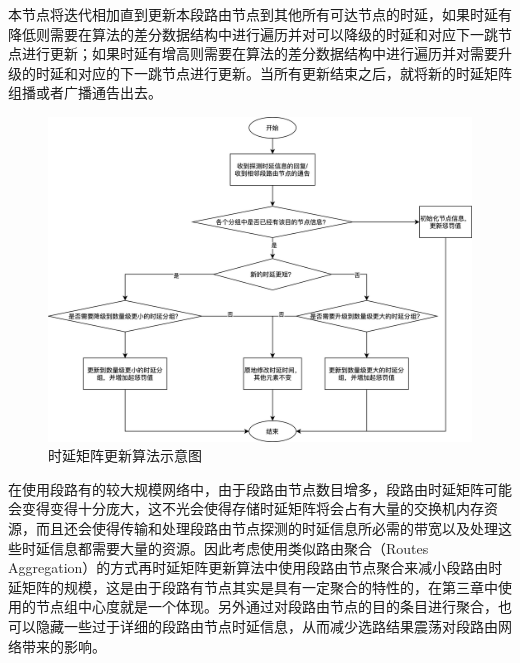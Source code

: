 本节点将迭代相加直到更新本段路由节点到其他所有可达节点的时延，如果时延有降低则需要在算法的差分数据结构中进行遍历并对可以降级的时延和对应下一跳节点进行更新；如果时延有增高则需要在算法的差分数据结构中进行遍历并对需要升级的时延和对应的下一跳节点进行更新。当所有更新结束之后，就将新的时延矩阵组播或者广播通告出去。

\begin{figure}[htbp]
\setlength{\abovecaptionskip}{15pt plus 3pt minus 2pt}
\centerline{\includegraphics[width=1\textwidth]{./figures/ch4-sr-update.png}}
\caption{时延矩阵更新算法示意图}
\label{fig-ch4-sr-update}
\end{figure}

在使用段路有的较大规模网络中，由于段路由节点数目增多，段路由时延矩阵可能会变得变得十分庞大，这不光会使得存储时延矩阵将会占有大量的交换机内存资源，而且还会使得传输和处理段路由节点探测的时延信息所必需的带宽以及处理这些时延信息都需要大量的资源。因此考虑使用类似路由聚合（Routes Aggregation）的方式再时延矩阵更新算法中使用段路由节点聚合来减小段路由时延矩阵的规模，这是由于段路有节点其实是具有一定聚合的特性的，在第三章中使用的节点组中心度就是一个体现。另外通过对段路由节点的目的条目进行聚合，也可以隐藏一些过于详细的段路由节点时延信息，从而减少选路结果震荡对段路由网络带来的影响。

